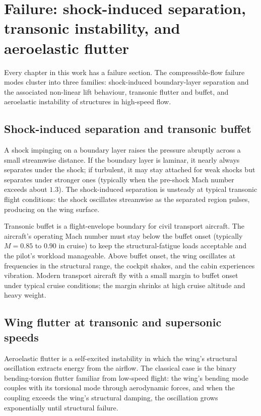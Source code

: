 \section{Failure: shock-induced separation, transonic instability, and aeroelastic flutter}

Every chapter in this work has a failure section. The
compressible-flow failure modes cluster into three families:
shock-induced boundary-layer separation and the associated
non-linear lift behaviour, transonic flutter and buffet, and
aeroelastic instability of structures in high-speed flow.

\subsection{Shock-induced separation and transonic buffet}

A shock impinging on a boundary layer raises the pressure
abruptly across a small streamwise distance. If the boundary
layer is laminar, it nearly always separates under the shock; if
turbulent, it may stay attached for weak shocks but separates
under stronger ones (typically when the pre-shock Mach number
exceeds about $1.3$). The shock-induced separation is unsteady at
typical transonic flight conditions: the shock oscillates
streamwise as the separated region pulses, producing
 on the wing surface.

Transonic buffet is a flight-envelope boundary for civil
transport aircraft. The aircraft's operating Mach number must
stay below the buffet onset (typically $M = 0.85$ to $0.90$ in
cruise) to keep the structural-fatigue loads acceptable and the
pilot's workload manageable. Above buffet onset, the wing
oscillates at frequencies in the structural range, the cockpit
shakes, and the cabin experiences vibration. Modern transport
aircraft fly with a small margin to buffet onset under typical
cruise conditions; the margin shrinks at high cruise altitude and
heavy weight.

\subsection{Wing flutter at transonic and supersonic speeds}

Aeroelastic flutter is a self-excited instability in which the
wing's structural oscillation extracts energy from the airflow.
The classical case is the binary bending-torsion flutter familiar
from low-speed flight: the wing's bending mode couples with its
torsional mode through aerodynamic forces, and when the coupling
exceeds the wing's structural damping, the oscillation grows
exponentially until structural failure.

